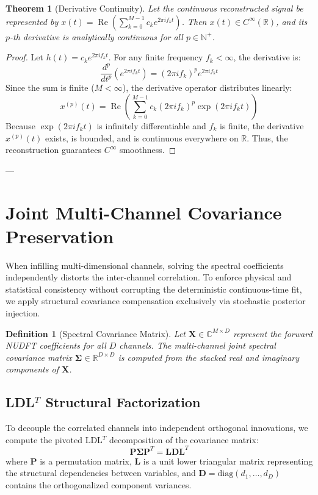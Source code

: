 \documentclass[11pt,a4paper]{article}
\newtheorem{theorem}{Theorem}
\newtheorem{definition}{Definition}
\begin{document}
\begin{theorem}[Derivative Continuity]
Let the continuous reconstructed signal be represented by $x(t) = \operatorname{Re} \left( \sum_{k=0}^{M-1} c_k e^{2\pi i f_k t} \right)$. Then $x(t) \in C^\infty(\mathbb{R})$, and its $p$-th derivative is analytically continuous for all $p \in \mathbb{N}^+$.
\end{theorem}

\begin{proof}
Let $h(t) = c_k e^{2\pi i f_k t}$. For any finite frequency $f_k < \infty$, the derivative is:
\begin{equation}
\frac{d^p}{dt^p} \left( e^{2\pi i f_k t} \right) = (2\pi i f_k)^p e^{2\pi i f_k t}
\end{equation}
Since the sum is finite ($M < \infty$), the derivative operator distributes linearly:
\begin{equation}
x^{(p)}(t) = \operatorname{Re} \left( \sum_{k=0}^{M-1} c_k (2\pi i f_k)^p \exp(2\pi i f_k t) \right)
\end{equation}
Because $\exp(2\pi i f_k t)$ is infinitely differentiable and $f_k$ is finite, the derivative $x^{(p)}(t)$ exists, is bounded, and is continuous everywhere on $\mathbb{R}$. Thus, the reconstruction guarantees $C^\infty$ smoothness.
\end{proof}

---

\section{Joint Multi-Channel Covariance Preservation}

When infilling multi-dimensional channels, solving the spectral coefficients independently distorts the inter-channel correlation. To enforce physical and statistical consistency without corrupting the deterministic continuous-time fit, we apply structural covariance compensation exclusively via stochastic posterior injection.

\begin{definition}[Spectral Covariance Matrix]
Let $\mathbf{X} \in \mathbb{C}^{M \times D}$ represent the forward NUDFT coefficients for all $D$ channels. The multi-channel joint spectral covariance matrix $\boldsymbol{\Sigma} \in \mathbb{R}^{D \times D}$ is computed from the stacked real and imaginary components of $\mathbf{X}$.
\end{definition}

\subsection{LDL$^T$ Structural Factorization}
To decouple the correlated channels into independent orthogonal innovations, we compute the pivoted LDL$^T$ decomposition of the covariance matrix:
\begin{equation}
\mathbf{P} \boldsymbol{\Sigma} \mathbf{P}^T = \mathbf{L} \mathbf{D} \mathbf{L}^T
\end{equation}
where $\mathbf{P}$ is a permutation matrix, $\mathbf{L}$ is a unit lower triangular matrix representing the structural dependencies between variables, and $\mathbf{D} = \text{diag}(d_1, \dots, d_D)$ contains the orthogonalized component variances.
\end{document}
